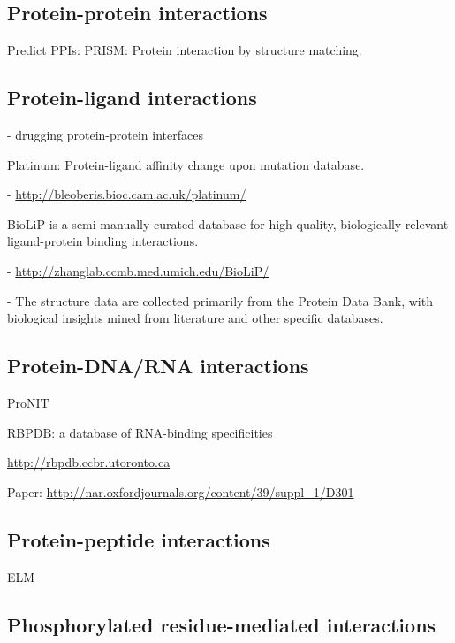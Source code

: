 \subsection{Protein-protein interactions}

Predict PPIs: PRISM: Protein interaction by structure matching.


\subsection{Protein-ligand interactions}

- drugging protein-protein interfaces \cite{wells_reaching_2007}

Platinum: Protein-ligand affinity change upon mutation database.

- \url{http://bleoberis.bioc.cam.ac.uk/platinum/}

BioLiP is a semi-manually curated database for high-quality, biologically relevant ligand-protein binding interactions.

- \url{http://zhanglab.ccmb.med.umich.edu/BioLiP/}

- The structure data are collected primarily from the Protein Data Bank, with biological insights mined from literature and other specific databases.


\subsection{Protein-DNA/RNA interactions}

ProNIT

RBPDB: a database of RNA-binding specificities

\url{http://rbpdb.ccbr.utoronto.ca}

Paper: \url{http://nar.oxfordjournals.org/content/39/suppl_1/D301}


\subsection{Protein-peptide interactions}

ELM


\subsection{Phosphorylated residue-mediated interactions}
